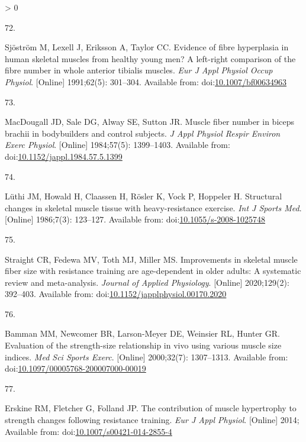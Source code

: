 \documentclass[twoside,10pt]{gihclass} %
\newlength{\cslhangindent}
\newlength{\csllabelwidth}
\newenvironment{CSLReferences}[3] %
 {%
  \setlength{\parindent}{0pt}
  \ifodd #1 \everypar{\setlength{\hangindent}{\cslhangindent}}\ignorespaces\fi
  \ifnum #2 > 0
  \setlength{\parskip}{#2\baselineskip}
  \fi
 }%
 {}
\newcommand{\CSLLeftMargin}[1]{\parbox[t]{\maxof{\widthof{#1}}{\csllabelwidth}}{#1}}
\newcommand{\CSLRightInline}[1]{\parbox[t]{\linewidth}{#1}}
\begin{document}
\begin{CSLReferences}{0}{0}
\leavevmode\hypertarget{ref-RN2742}{}%
\CSLLeftMargin{72. }
\CSLRightInline{Sjöström M, Lexell J, Eriksson A, Taylor CC. Evidence of fibre hyperplasia in human skeletal muscles from healthy young men? A left-right comparison of the fibre number in whole anterior tibialis muscles. \emph{Eur J Appl Physiol Occup Physiol}. {[}Online{]} 1991;62(5): 301--304. Available from: doi:\href{https://doi.org/10.1007/bf00634963}{10.1007/bf00634963}}

\leavevmode\hypertarget{ref-RN2754}{}%
\CSLLeftMargin{73. }
\CSLRightInline{MacDougall JD, Sale DG, Alway SE, Sutton JR. Muscle fiber number in biceps brachii in bodybuilders and control subjects. \emph{J Appl Physiol Respir Environ Exerc Physiol}. {[}Online{]} 1984;57(5): 1399--1403. Available from: doi:\href{https://doi.org/10.1152/jappl.1984.57.5.1399}{10.1152/jappl.1984.57.5.1399}}

\leavevmode\hypertarget{ref-RN2731}{}%
\CSLLeftMargin{74. }
\CSLRightInline{Lüthi JM, Howald H, Claassen H, Rösler K, Vock P, Hoppeler H. Structural changes in skeletal muscle tissue with heavy-resistance exercise. \emph{Int J Sports Med}. {[}Online{]} 1986;7(3): 123--127. Available from: doi:\href{https://doi.org/10.1055/s-2008-1025748}{10.1055/s-2008-1025748}}

\leavevmode\hypertarget{ref-RN2669}{}%
\CSLLeftMargin{75. }
\CSLRightInline{Straight CR, Fedewa MV, Toth MJ, Miller MS. Improvements in skeletal muscle fiber size with resistance training are age-dependent in older adults: A systematic review and meta-analysis. \emph{Journal of Applied Physiology}. {[}Online{]} 2020;129(2): 392--403. Available from: doi:\href{https://doi.org/10.1152/japplphysiol.00170.2020}{10.1152/japplphysiol.00170.2020}}

\leavevmode\hypertarget{ref-RN2758}{}%
\CSLLeftMargin{76. }
\CSLRightInline{Bamman MM, Newcomer BR, Larson-Meyer DE, Weinsier RL, Hunter GR. Evaluation of the strength-size relationship in vivo using various muscle size indices. \emph{Med Sci Sports Exerc}. {[}Online{]} 2000;32(7): 1307--1313. Available from: doi:\href{https://doi.org/10.1097/00005768-200007000-00019}{10.1097/00005768-200007000-00019}}

\leavevmode\hypertarget{ref-RN1142}{}%
\CSLLeftMargin{77. }
\CSLRightInline{Erskine RM, Fletcher G, Folland JP. The contribution of muscle hypertrophy to strength changes following resistance training. \emph{Eur J Appl Physiol}. {[}Online{]} 2014; Available from: doi:\href{https://doi.org/10.1007/s00421-014-2855-4}{10.1007/s00421-014-2855-4}}


\end{CSLReferences}
\end{document}
